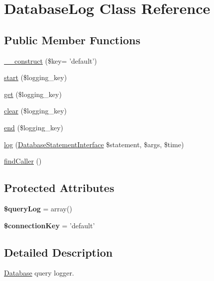 \hypertarget{classDatabaseLog}{
\section{DatabaseLog Class Reference}
\label{classDatabaseLog}
}
\subsection*{Public Member Functions}
\begin{DoxyCompactItemize}
\item 
\hyperlink{classDatabaseLog_a4a73f612d4625189787c54ff361fd15e}{\_\-\_\-construct} (\$key= 'default')
\item 
\hyperlink{classDatabaseLog_a9e563dc89a838deefce998de656f4631}{start} (\$logging\_\-key)
\item 
\hyperlink{classDatabaseLog_a2fb927cb8c8ddee8819fba8333f6edca}{get} (\$logging\_\-key)
\item 
\hyperlink{classDatabaseLog_a26e486bc63ee0dcfbfb82401815500f6}{clear} (\$logging\_\-key)
\item 
\hyperlink{classDatabaseLog_a921215904c818b7e31fa5e24102eb0a2}{end} (\$logging\_\-key)
\item 
\hyperlink{classDatabaseLog_a1059d7d9b785b085e609add4c7cbb7f5}{log} (\hyperlink{interfaceDatabaseStatementInterface}{DatabaseStatementInterface} \$statement, \$args, \$time)
\item 
\hyperlink{classDatabaseLog_ae7b59ed8cd8e6163331d307db4531554}{findCaller} ()
\end{DoxyCompactItemize}
\subsection*{Protected Attributes}
\begin{DoxyCompactItemize}
\item 
\hypertarget{classDatabaseLog_a0046dd0598b8b8c1dcf73f49c887e68e}{
{\bfseries \$queryLog} = array()}
\label{classDatabaseLog_a0046dd0598b8b8c1dcf73f49c887e68e}

\item 
\hypertarget{classDatabaseLog_a4d944f9a5b64b6fa3403a8e15cec6703}{
{\bfseries \$connectionKey} = 'default'}
\label{classDatabaseLog_a4d944f9a5b64b6fa3403a8e15cec6703}

\end{DoxyCompactItemize}


\subsection{Detailed Description}
\hyperlink{classDatabase}{Database} query logger.


